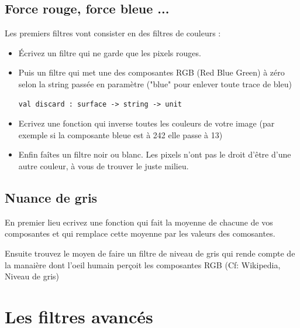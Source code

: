 \documentclass[a4paper]{article}
\begin{document}
\subsection{Force rouge, force bleue ...}
Les premiers filtres vont consister en des filtres de couleurs :\\
\begin{itemize}
\item Écrivez un filtre qui ne garde que les pixels rouges.
\item Puis un filtre qui met une des composantes RGB (Red Blue Green) à zéro selon la string 
passée en paramètre ("blue" pour enlever toute trace de bleu)

\begin{verbatim}
val discard : surface -> string -> unit
\end{verbatim}

\item Ecrivez une fonction qui inverse toutes les couleurs de votre image (par exemple si la composante bleue est à 242 elle passe à 13)

\item Enfin faîtes un filtre noir ou blanc. Les pixels n'ont pas le droit d'être d'une autre couleur, à vous de trouver le juste milieu.

\end{itemize}
\subsection{Nuance de gris}

En premier lieu ecrivez une fonction qui fait la moyenne de chacune de vos composantes et qui remplace cette moyenne par les valeurs des comosantes.

Ensuite trouvez le moyen de faire un filtre de niveau de gris qui rende compte de la manaière dont l'oeil humain perçoit les composantes RGB (Cf: Wikipedia, Niveau de gris)

\section{Les filtres avancés}
\end{document}

